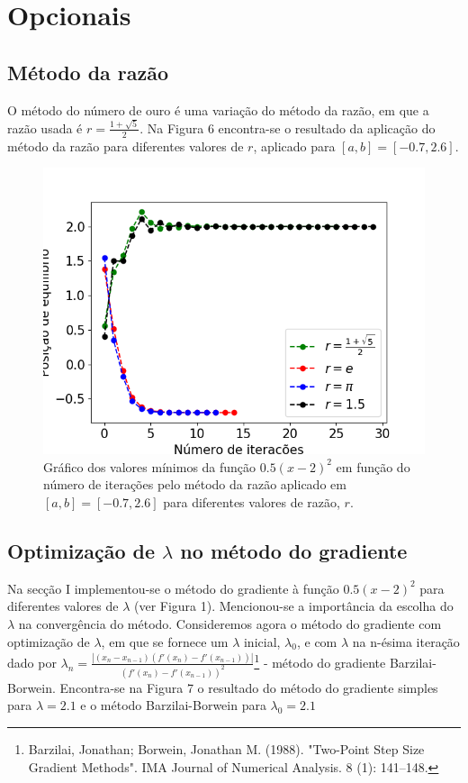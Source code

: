 \documentclass[aps,pre,twocolumn,showpacs,amsmath,amssymb]{revtex4-1}
\begin{document}
\section{Opcionais}

\subsection{Método da razão}
O método do número de ouro é uma variação do método da razão, em que a razão usada é $r=\frac{1+\sqrt{5}}{2}$. Na Figura 6 encontra-se o resultado da aplicação do método da razão para diferentes valores de $r$, aplicado para $[a,b]=[-0.7,2.6]$.
\begin{figure}[h]\vspace{-5ex}
   \begin{center}
    \includegraphics[width=\columnwidth]{ratiomethods.png}
\caption{Gráfico dos valores mínimos da função $0.5(x-2)^2$ em função do número de iterações pelo método da razão aplicado em $[a,b]=[-0.7,2.6]$ para diferentes valores de razão, $r$.}
  \label{ratiomethods}
   \end{center}
\end{figure}

\subsection{Optimização de $\lambda$ no método do gradiente}
Na secção I implementou-se o método do gradiente à função $0.5(x-2)^2$ para diferentes valores de $\lambda$ (ver Figura 1). Mencionou-se a importância da escolha do $\lambda$ na convergência do método. Consideremos agora o método do gradiente com optimização de $\lambda$, em que se fornece um $\lambda$ inicial, $\lambda_0$, e com $\lambda$ na n-ésima iteração dado por $\lambda_n=\frac{|(x_n-x_{n-1})(f'(x_n)-f'(x_{n-1}))|}{(f'(x_n)-f'(x_{n-1}))^2}$\footnote{Barzilai, Jonathan; Borwein, Jonathan M. (1988). "Two-Point Step Size Gradient Methods". IMA Journal of Numerical Analysis. 8 (1): 141–148.} - método do gradiente Barzilai-Borwein. Encontra-se na Figura 7 o resultado do método do gradiente simples para $\lambda=2.1$ e o método Barzilai-Borwein para $\lambda_0=2.1$
\end{document}
